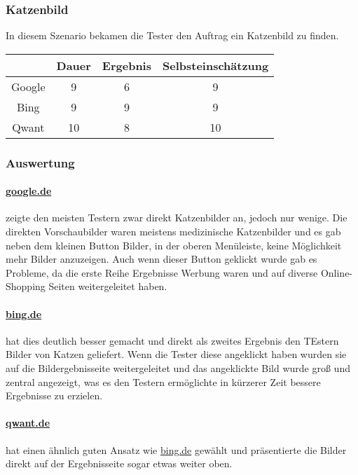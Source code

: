 \subsubsection{Katzenbild}\label{subsubsec:szenario2}
In diesem Szenario bekamen die Tester den Auftrag ein Katzenbild zu finden.

\begin{tabular}{|c|c|c|c|}
    \hline
    & Dauer & Ergebnis & Selbsteinschätzung \\
    \hline
    Google & 9     & 6        & 9                  \\
    \hline
    Bing   & 9     & 9        & 9                  \\
    \hline
    Qwant  & 10    & 8       & 10                 \\
    \hline
\end{tabular}

\subsubsection*{Auswertung}
\paragraph{\url{google.de}} zeigte den meisten Testern zwar direkt Katzenbilder an, jedoch nur wenige.
Die direkten Vorschaubilder waren meistens medizinische Katzenbilder und es gab neben dem kleinen Button Bilder, in der oberen Menüleiste, keine Möglichkeit mehr Bilder anzuzeigen.
Auch wenn dieser Button geklickt wurde gab es Probleme, da die erste Reihe Ergebnisse Werbung waren und auf diverse Online-Shopping Seiten weitergeleitet haben.\\

\paragraph{\url{bing.de}} hat dies deutlich besser gemacht und direkt als zweites Ergebnis den TEstern Bilder von Katzen geliefert.
Wenn die Tester diese angeklickt haben wurden sie auf die Bildergebnisseite weitergeleitet und das angeklickte Bild wurde groß und zentral angezeigt,
was es den Testern ermöglichte in kürzerer Zeit bessere Ergebnisse zu erzielen.\\

\paragraph{\url{qwant.de}} hat einen ähnlich guten Ansatz wie \url{bing.de} gewählt und präsentierte die Bilder direkt auf der Ergebnisseite sogar etwas weiter oben.


